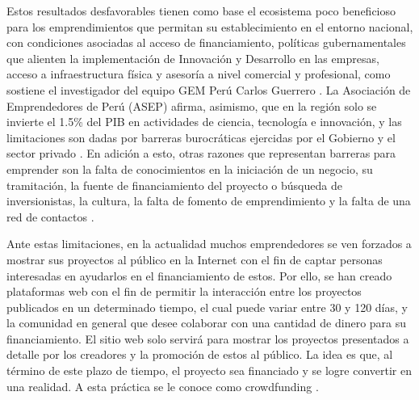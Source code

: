 Estos resultados desfavorables tienen como base el ecosistema poco beneficioso para los emprendimientos que permitan su establecimiento en el entorno nacional, con condiciones asociadas al acceso de financiamiento, políticas gubernamentales que alienten la implementación de Innovación y Desarrollo en las empresas, acceso a infraestructura física y asesoría a nivel comercial y profesional, como sostiene el investigador del equipo GEM Perú Carlos Guerrero \parencite{cr_gestion2018emprend}. La Asociación de Emprendedores de Perú (ASEP) afirma, asimismo, que en la región solo se invierte el 1.5\% del PIB en actividades de ciencia, tecnología e innovación, y las limitaciones son dadas por barreras burocráticas ejercidas por el Gobierno y el sector privado \parencite{cr_aep2018emprend}. En adición a esto, otras razones que representan barreras para emprender son la falta de conocimientos en la iniciación de un negocio, su tramitación, la fuente de financiamiento del proyecto o búsqueda de inversionistas, la cultura, la falta de fomento de emprendimiento y la falta de una red de contactos \parencite{cr_sandoval_barreras}.

Ante estas limitaciones, en la actualidad muchos emprendedores se ven forzados a mostrar sus proyectos al público en la Internet con el fin de captar personas interesadas en ayudarlos en el financiamiento de estos. Por ello, se han creado plataformas web con el fin de permitir la interacción entre los proyectos publicados en un determinado tiempo, el cual puede variar entre 30 y 120 días, y la comunidad en general que desee colaborar con una cantidad de dinero para su financiamiento. El sitio web solo servirá para mostrar los proyectos presentados a detalle por los creadores y la promoción de estos al público. La idea es que, al término de este plazo de tiempo, el proyecto sea financiado y se logre convertir en una realidad. A esta práctica se le conoce como crowdfunding \parencite{cr_uc_crowdfunding}.

